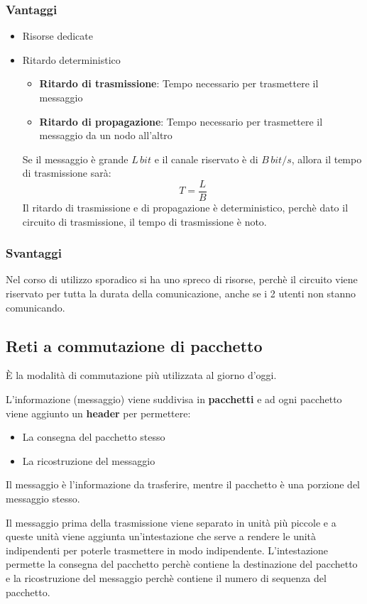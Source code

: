 \documentclass[a4paper]{article}
\begin{document}
\subsubsection{Vantaggi}
\begin{itemize}
  \item Risorse dedicate
  \item Ritardo deterministico

    \noindent
    \begin{itemize}
      \item \textbf{Ritardo di trasmissione}: Tempo necessario per trasmettere il messaggio
      \item \textbf{Ritardo di propagazione}: Tempo necessario per trasmettere il messaggio
        da un nodo all'altro
    \end{itemize}
    Se il messaggio è grande \( L\,bit \) e il canale riservato è di \( B\,bit/s \),
    allora il tempo di trasmissione sarà:
    \[
    T = \frac{L}{B}
    \] 
    Il ritardo di trasmissione e di propagazione è deterministico, perchè
    dato il circuito di trasmissione, il tempo di trasmissione è noto.
\end{itemize}

\subsubsection{Svantaggi}
Nel corso di utilizzo sporadico si ha uno spreco di risorse, perchè il circuito
viene riservato per tutta la durata della comunicazione, anche se i 2 utenti
non stanno comunicando.
\label{09-10-D6}

\subsection{Reti a commutazione di pacchetto}
È la modalità di commutazione più utilizzata al giorno d'oggi.

\noindent
L'informazione (messaggio) viene suddivisa in \textbf{pacchetti} e ad ogni
pacchetto viene aggiunto un \textbf{header} per permettere:
\begin{itemize}
  \item La consegna del pacchetto stesso
  \item La ricostruzione del messaggio
\end{itemize}

Il messaggio è l'informazione da trasferire, mentre il pacchetto è una porzione
del messaggio stesso.

\noindent
Il messaggio prima della trasmissione viene separato in unità più piccole e a
queste unità viene aggiunta un'intestazione che serve a rendere le unità indipendenti
per poterle trasmettere in modo indipendente. L'intestazione permette la consegna del
pacchetto perchè contiene la destinazione del pacchetto e la ricostruzione del messaggio
perchè contiene il numero di sequenza del pacchetto.
\label{09-10-D7}
\end{document}
